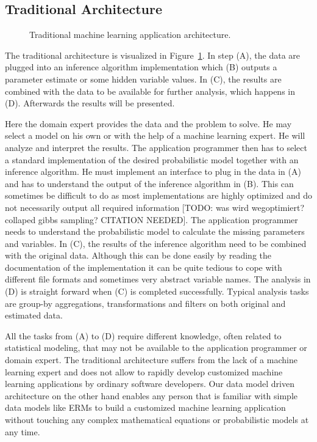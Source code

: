 \subsection{Traditional Architecture}

\begin{figure}[t]
\centering
\scalebox{\tikzScale}{\adjustTikzSize }
\caption{Traditional machine learning application architecture.}\label{fig:ml-application-architecture}
\end{figure}

The traditional architecture is visualized in Figure~\ref{fig:ml-application-architecture}. In step (A), the data are plugged into an inference algorithm implementation which (B) outputs a parameter estimate or some hidden variable values. In (C), the results are combined with the data to be available for further analysis, which happens in (D). Afterwards the results will be presented.

Here the domain expert provides the data and the problem to solve. He may select a model on his own or with the help of a machine learning expert. He will analyze and interpret the results. The application programmer then has to select a standard implementation of the desired probabilistic model together with an inference algorithm. He must implement an interface to plug in the data in (A) and has to understand the output of the inference algorithm in (B). This can sometimes be difficult to do as most implementations are highly optimized and do not necessarily output all required information [TODO: was wird wegoptimiert? collaped gibbs sampling? CITATION NEEDED]. The application programmer needs to understand the probabilistic model to calculate the missing parameters and variables. In (C), the results of the inference algorithm need to be combined with the original data. Although this can be done easily by reading the documentation of the implementation it can be quite tedious to cope with different file formats and sometimes very abstract variable names. The analysis in (D) is straight forward when (C) is completed successfully. Typical analysis tasks are group-by aggregations, transformations and filters on both original and estimated data.

All the tasks from (A) to (D) require different knowledge, often related to statistical modeling, that may not be available to the application programmer or domain expert. The traditional architecture suffers from the lack of a machine learning expert and does not allow to rapidly develop customized machine learning applications by ordinary software developers. Our data model driven architecture on the other hand enables any person that is familiar with simple data models like ERMs to build a customized machine learning application without touching any complex mathematical equations or probabilistic models at any time.

